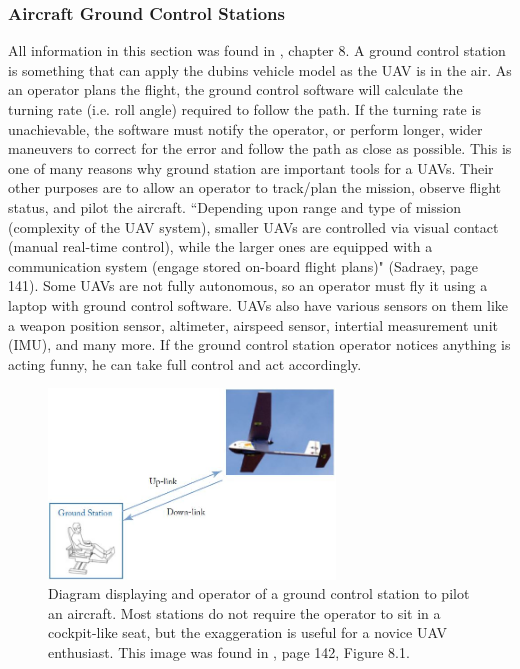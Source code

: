 \documentclass[12pt,journal,compsoc]{IEEEtran}
\begin{document}
\subsubsection{Aircraft Ground Control Stations}
All information in this section was found in \cite{U-A-D}, chapter 8. A ground control station is something that can apply the dubins vehicle model as the UAV is in the air. As an operator plans the flight, the ground control software will calculate the turning rate (i.e. roll angle) required to follow the path. If the turning rate is unachievable, the software must notify the operator, or perform longer, wider maneuvers to correct for the error and follow the path as close as possible. This is one of many reasons why ground station are important tools for a UAVs. Their other purposes are to allow an operator to track/plan the mission, observe flight status, and pilot the aircraft. ``Depending upon range and type of mission (complexity of the UAV system), smaller UAVs are controlled via visual contact (manual real-time control), while the larger ones are equipped with a communication system (engage stored on-board flight plans)" (Sadraey, page 141). Some UAVs are not fully autonomous, so an operator must fly it using a laptop with ground control software. UAVs also have various sensors on them like a weapon position sensor, altimeter, airspeed sensor, intertial measurement unit (IMU), and many more. If the ground control station operator notices anything is acting funny, he can take full control and act accordingly.
\begin{figure}[h!]
\hspace*{0cm}
\centering
\includegraphics[width=3in]{groundControl.jpg}
\caption{Diagram displaying and operator of a ground control station to pilot an aircraft. Most stations do not require the operator to sit in a cockpit-like seat, but the exaggeration is useful for a novice UAV enthusiast. This image was found in \cite{U-A-D}, page 142, Figure 8.1.}
\label{gcDiagram}
\end{figure}
\end{document}
